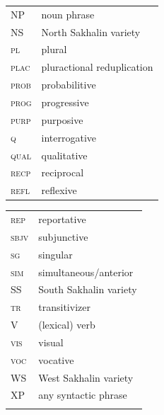 \documentclass[output=paper,colorlinks,citecolor=brown]{langscibook}
\begin{document}
\begin{tabularx}{.45\textwidth}{lQ}
NP & noun phrase\\
NS & North Sakhalin variety\\
\scshape pl & plural\\
\scshape plac  & pluractional reduplication\\
\scshape prob & probabilitive\\
\scshape prog & progressive\\
\scshape purp  & purposive  \\
\scshape q & interrogative\\
\scshape qual & qualitative\\
\scshape recp & reciprocal\\
\scshape refl & reflexive\\
\end{tabularx}
\begin{tabularx}{.45\textwidth}{lQ}
\scshape rep  & reportative  \\ 
\scshape sbjv  & subjunctive  \\
\scshape sg & singular\\
\scshape sim  & simultaneous/anterior \\
SS & South Sakhalin variety\\
\scshape tr & transitivizer\\
V & (lexical) verb\\
\scshape vis & visual \\
\scshape voc & vocative\\
WS & West Sakhalin variety\\
XP & any syntactic phrase\\
\\
\end{tabularx}
\nocite{Kreinovich1937,KreinovichMs}%


\sloppy\printbibliography[heading=subbibliography,notkeyword=this]
\end{document}
